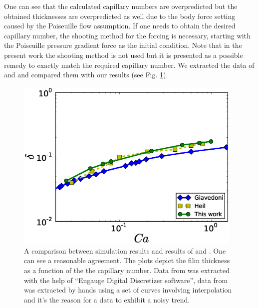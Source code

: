 \documentclass[preprint,12pt]{elsarticle}
\begin{document}
One can see that the calculated
capillary numbers are overpredicted but the obtained thicknesses are overpredicted
as well due to the body force setting caused by the Poiseuille flow assumption. If one
needs to obtain the desired capillary number, the shooting method for the forcing is
necessary, starting with the Poiseuille pressure gradient force as the initial condition. 
{\color{red} Note that in the present work the shooting method is not used but it is presented as
a possible remedy to exactly match the required capillary number.} 
We
extracted
the data of 
\citet{giavedoni-numerical} and \citet{heil-bretherton} and compared them with our results (see 
Fig. \ref{fig:capillary:comparison}).
\begin{figure}
\includegraphics[width=0.97\textwidth]{Figures/Capillary/capillaries_comparison_real.eps}
\caption{A comparison between simulation results and results of
\citet{giavedoni-numerical} and \citet{heil-bretherton}. One can see a
reasonable agreement. The plots depict the film thickness as a function of the
the capillary number. {\color{red} Data from \cite{giavedoni-numerical} was
extracted with the help of ``Engauge Digital Discretizer software'', data from
\citet{heil-bretherton} was extracted by hands using a set of curves involving interpolation and
it's the reason for a data to exhibit a noisy trend.} \label{fig:capillary:comparison}}
\end{figure}
\end{document}
